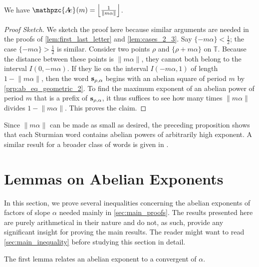 \documentclass[a4paper,fleqn]{article}
\providecommand{\norm}[1]{\lVert#1\rVert}
\providecommand{\Floor}[1]{\left\lfloor#1\right\rfloor}
\newcommand{\infw}[1]{%
  \ifcat\noexpand#1\relax\bm{#1}%
  \else\mathbf{#1}\fi}          %
\newcommand{\abexp}[2][]{\mathpzc{A\mkern-3mu e}_{#1}(#2)}
\newcommand{\T}{\mathbb{T}}
\begin{document}
  \begin{proposition}\label{prp:exp_formula} \cite[Thm.~4.7]{2016:abelian_powers_and_repetitions_in_sturmian_words}
    We have $\abexp{m} = \Floor{\tfrac{1}{\norm{m\alpha}}}$.
  \end{proposition}
  \begin{proof}[Proof Sketch]
    We sketch the proof here because similar arguments are needed in the proofs of \autoref{lem:first_last_letter} and
    \autoref{lem:cases_2_3}. Say $\{-m\alpha\} < \tfrac12$; the case $\{-m\alpha\} > \tfrac12$ is similar. Consider two
    points $\rho$ and $\{\rho + m\alpha\}$ on $\T$. Because the distance between these points is $\norm{m\alpha}$, they
    cannot both belong to the interval $I(0, -m\alpha)$. If they lie on the interval $I(-m\alpha, 1)$ of length
    $1 - \norm{m\alpha}$, then the word $\infw{s}_{\rho,\alpha}$ begins with an abelian square of period $m$ by
    \autoref{prp:ab_eq_geometric_2}. To find the maximum exponent of an abelian power of period $m$ that is a prefix of
    $\infw{s}_{\rho,\alpha}$, it thus suffices to see how many times $\norm{m\alpha}$ divides $1 - \norm{m\alpha}$.
    This proves the claim.
  \end{proof}

  Since $\norm{m\alpha}$ can be made as small as desired, the preceding proposition shows that each Sturmian word
  contains abelian powers of arbitrarily high exponent. A similar result for a broader class of words is given in
  \cite[Thm.~1.8]{2011:abelian_complexity_of_minimal_subshifts}.

  \section{Lemmas on Abelian Exponents}\label{sec:abelian_exponents}
  In this section, we prove several inequalities concerning the abelian exponents of factors of slope $\alpha$ needed
  mainly in \autoref{sec:main_proofs}. The results presented here are purely arithmetical in their nature and do not,
  as such, provide any significant insight for proving the main results. The reader might want to read
  \autoref{sec:main_inequality} before studying this section in detail.

  The first lemma relates an abelian exponent to a convergent of $\alpha$.
\end{document}
